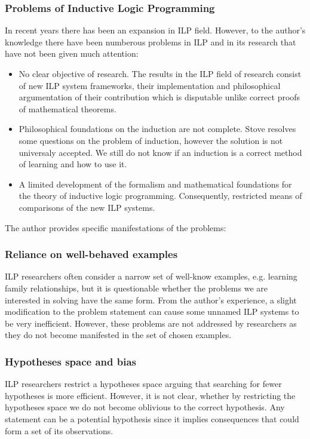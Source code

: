 \subsubsection{Problems of Inductive Logic Programming}
In recent years there has been an expansion in ILP field. However, to the author's knowledge there have been numberous problems in ILP and in its research that have not been given much attention:

\begin{itemize}
\item No clear objective of research. The results in the ILP field of research consist of new ILP system frameworks, their implementation and philosophical argumentation of their contribution which is disputable unlike correct proofs of mathematical theorems.
\item Philosophical foundations on the induction are not complete. Stove \cite{stove1986} resolves some questions on the problem of induction, however the solution is not universaly accepted. We still do not know if an induction is a correct method of learning and how to use it.
\item A limited development of the formalism and mathematical foundations for the theory of inductive logic programming. Consequently, restricted means of comparisons of the new ILP systems.
\end{itemize}

The author provides specific manifestations of the problems:

\subsubsection{Reliance on well-behaved examples}
ILP researchers often consider a narrow set of well-know examples, e.g. learning family relationships, but it is questionable whether the problems we are interested in solving have the same form. From the author's experience, a slight modification to the problem statement can cause some unnamed ILP systems to be very inefficient. However, these problems are not addressed by researchers as they do not become manifested in the set of chosen examples.

\subsubsection{Hypotheses space and bias}
ILP researchers restrict a hypotheses space arguing that searching for fewer hypotheses is more efficient. However, it is not clear, whether by restricting the hypotheses space we do not become oblivious to the correct hypothesis. Any statement can be a potential hypothesis since it implies consequences that could form a set of its observations.

